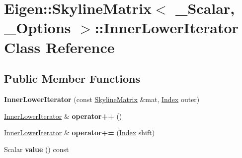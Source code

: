 \hypertarget{class_eigen_1_1_skyline_matrix_1_1_inner_lower_iterator}{}\section{Eigen\+:\+:Skyline\+Matrix$<$ \+\_\+\+Scalar, \+\_\+\+Options $>$\+:\+:Inner\+Lower\+Iterator Class Reference}
\label{class_eigen_1_1_skyline_matrix_1_1_inner_lower_iterator}
\subsection*{Public Member Functions}
\begin{DoxyCompactItemize}
\item 
\mbox{\label{class_eigen_1_1_skyline_matrix_1_1_inner_lower_iterator_a740643607c31dc8941b6355e043b06ee}} 
{\bfseries Inner\+Lower\+Iterator} (const \hyperlink{class_eigen_1_1_skyline_matrix}{Skyline\+Matrix} \&mat, \hyperlink{group___core___module_a554f30542cc2316add4b1ea0a492ff02}{Index} outer)
\item 
\mbox{\label{class_eigen_1_1_skyline_matrix_1_1_inner_lower_iterator_ad40abfd1877e79d8c0849998a2dced03}} 
\hyperlink{class_eigen_1_1_skyline_matrix_1_1_inner_lower_iterator}{Inner\+Lower\+Iterator} \& {\bfseries operator++} ()
\item 
\mbox{\label{class_eigen_1_1_skyline_matrix_1_1_inner_lower_iterator_afd9c05caee16637b17973124b5ec6ea9}} 
\hyperlink{class_eigen_1_1_skyline_matrix_1_1_inner_lower_iterator}{Inner\+Lower\+Iterator} \& {\bfseries operator+=} (\hyperlink{group___core___module_a554f30542cc2316add4b1ea0a492ff02}{Index} shift)
\item 
\mbox{\label{class_eigen_1_1_skyline_matrix_1_1_inner_lower_iterator_ac4a5162828d1ec3b28fc83ad099c6178}} 
Scalar {\bfseries value} () const
\item 
\mbox{\label{class_eigen_1_1_skyline_matrix_1_1_inner_lower_iterator_a6552e0313befa39eb94b2480225bc76b}} 

\end{DoxyCompactItemize}
